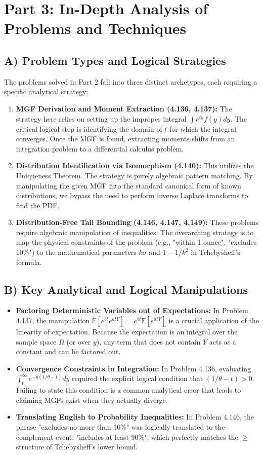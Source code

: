 \documentclass[11pt, a4paper]{article}
\theoremstyle{definition}
\theoremstyle{remark}
\newcommand{\E}{\mathbb{E}}
\begin{document}
\newpage

\section{Part 3: In-Depth Analysis of Problems and Techniques}

\subsection{A) Problem Types and Logical Strategies}
The problems solved in Part 2 fall into three distinct archetypes, each requiring a specific analytical strategy:
\begin{enumerate}
    \item \textbf{MGF Derivation and Moment Extraction (4.136, 4.137):} The strategy here relies on setting up the improper integral $\int e^{ty} f(y) dy$. The critical logical step is identifying the domain of $t$ for which the integral converges. Once the MGF is found, extracting moments shifts from an integration problem to a differential calculus problem.
    \item \textbf{Distribution Identification via Isomorphism (4.140):} This utilizes the Uniqueness Theorem. The strategy is purely algebraic pattern matching. By manipulating the given MGF into the standard canonical form of known distributions, we bypass the need to perform inverse Laplace transforms to find the PDF.
    \item \textbf{Distribution-Free Tail Bounding (4.146, 4.147, 4.149):} These problems require algebraic manipulation of inequalities. The overarching strategy is to map the physical constraints of the problem (e.g., "within 1 ounce", "excludes 10\%") to the mathematical parameters $k\sigma$ and $1 - 1/k^2$ in Tchebysheff's formula.
\end{enumerate}

\subsection{B) Key Analytical and Logical Manipulations}
\begin{itemize}
    \item \textbf{Factoring Deterministic Variables out of Expectations:} In Problem 4.137, the manipulation $\E[e^{bt} e^{atY}] = e^{bt} \E[e^{atY}]$ is a crucial application of the linearity of expectation. Because the expectation is an integral over the sample space $\Omega$ (or over $y$), any term that does not contain $Y$ acts as a constant and can be factored out.
    \item \textbf{Convergence Constraints in Integration:} In Problem 4.136, evaluating $\int_{0}^{\infty} e^{-y(1/\theta - t)} dy$ required the explicit logical condition that $(1/\theta - t) > 0$. Failing to state this condition is a common analytical error that leads to claiming MGFs exist when they actually diverge.
    \item \textbf{Translating English to Probability Inequalities:} In Problem 4.146, the phrase "excludes no more than 10\%" was logically translated to the complement event: "includes at least 90\%", which perfectly matches the $\ge$ structure of Tchebysheff's lower bound.
\end{itemize}
\end{document}
